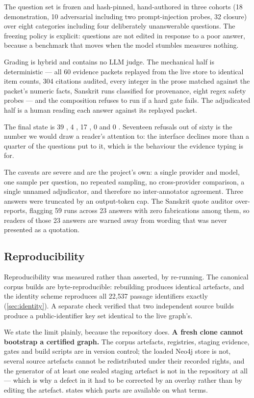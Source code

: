 The question set is frozen and hash-pinned, hand-authored in three cohorts (18
demonstration, 10 adversarial including two prompt-injection probes, 32 closure) over
eight categories including four deliberately unanswerable questions. The freezing
policy is explicit: questions are not edited in response to a poor answer, because a
benchmark that moves when the model stumbles measures nothing.

Grading is hybrid and contains no \mbox{LLM} judge. The mechanical half is
deterministic --- all 60 evidence packets replayed from the live store to identical
item counts, 304 citations audited, every integer in the prose matched against the
packet's numeric facts, Sanskrit runs classified for provenance, eight regex safety
probes --- and the composition refuses to run if a hard gate fails. The adjudicated
half is a human reading each answer against its replayed packet.

The final state is 39 , 4 , 17
, 0  and 0
. Seventeen refusals out of sixty is the number we would draw a
reader's attention to: the interface declines more than a quarter of the questions
put to it, which is the behaviour the evidence typing is for.

The caveats are severe and are the project's own: a single provider and model, one
sample per question, no repeated sampling, no cross-provider comparison, a single
unnamed adjudicator, and therefore no inter-annotator agreement. Three answers were
truncated by an output-token cap. The Sanskrit quote auditor over-reports, flagging
59 runs across 23 answers with zero fabrications among them, so readers of those 23
answers are warned away from wording that was never presented as a quotation.

\subsection{Reproducibility}
\label{sec:reproducibility}

Reproducibility was measured rather than asserted, by re-running. The canonical
corpus builds are byte-reproducible: rebuilding produces identical artefacts, and the
identity scheme reproduces all 22{,}537 passage identifiers exactly
(\cref{sec:identity}). A separate check verified that two independent source builds
produce a public-identifier key set identical to the live graph's.

We state the limit plainly, because the repository does. \textbf{A fresh clone cannot
bootstrap a certified graph.} The corpus artefacts, registries, staging evidence,
gates and build scripts are in version control; the loaded Neo4j store is not, several
source artefacts cannot be redistributed under their recorded rights, and the
generator of at least one sealed staging artefact is not in the repository at all ---
which is why a defect in it had to be corrected by an overlay rather than by editing
the artefact.  states which parts are available on what
terms.
